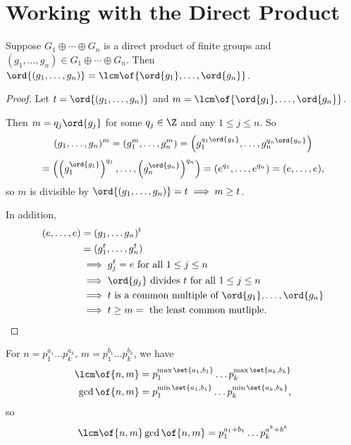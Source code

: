 \chapter{Working with the Direct Product}

\begin{theorem}
    Suppose $G_1 \oplus \cdots \oplus G_n$ is a direct product of finite groups and $(g_1, \dots, g_n) \in G_1 \oplus \cdots \oplus G_n$. Then $\ord{(g_1,\dots,g_n)} = \lcm\of{\ord{g_1}, \dots, \ord{g_n}}$.
\end{theorem}
\begin{proof}
    Let $t = \ord{(g_1, \dots, g_n)}$ and $m = \lcm\of{\ord{g_1},\dots, \ord{g_n}}$.

    Then $m = q_j \ord{g_j}$ for some $q_j \in \Z$ and any $1 \leq j \leq n$. So \[(g_1, \dots, g_n)^m = (g_1^m, \dots, g_n^m) = \left(g_1^{q_1 \ord{g_1}}, \dots, g_n^{q_n \ord{g_n}}\right) \]\[= \left(\left(g_1^{\ord{g_1}}\right)^{q_1}, \dots, \left(g_n^{\ord{g_n}}\right)^{q_n}\right) = (e^{q_1}, \dots, e^{q_n}) = (e, \dots, e),\]
    so $m$ is divisible by $\ord{(g_1, \dots, g_n)} = t \implies m \geq t$.

    In addition, \begin{align*}
        (e, \dots, e) &= (g_1, \dots g_n)^t \\
        &= (g_1^t, \dots, g_n^t) \\
        &\implies g_j^t = e \text{ for all } 1 \leq j \leq n \\
        &\implies \ord{g_j} \text{ divides } t \text{ for all } 1 \leq j \leq n \\
        &\implies t \text{ is a common multiple of } \ord{g_1}, \dots, \ord{g_n} \\
        &\implies t \geq m = \text{ the least common mutliple}.
    \end{align*}
\end{proof}

\begin{remark}
    For $n = p_1^{a_1} \dots p_k^{a_k}$, $m = p_1^{b_1} \dots p_k^{b_k}$, we have
    \begin{align*}
        \lcm\of{n,m} &= p_1^{\max\set{a_1,b_1}} \dots p_k^{\max\set{a_k,b_k}} \\
        \gcd\of{n,m} &= p_1^{\min\set{a_1,b_1}} \dots p_k^{\min\set{a_k,b_k}},
    \end{align*}
    so \[\lcm\of{n,m} \gcd\of{n,m} = p_1^{a_1 + b_1} \dots p_k^{a^k + b^k}\]
\end{remark}

